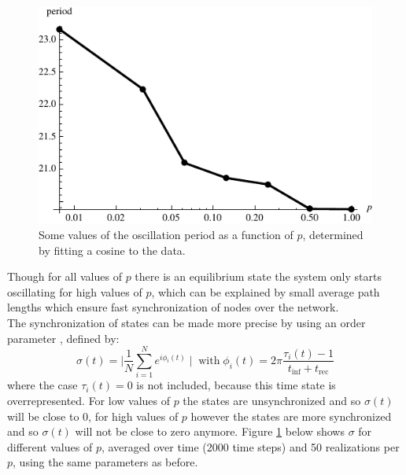 \documentclass[10pt,a4paper]{article}
\begin{document}
\begin{figure}[H]
  \centering
  \includegraphics[scale=1.1]{period.pdf}
  \caption{Some values of the oscillation period as a function of $p$, determined by fitting a cosine to the data.}
  \label{fig:sigma}
\end{figure}

\noindent Though for all values of $p$ there is an equilibrium state the system only starts oscillating for high values of $p$, which can be explained by small average path lengths which ensure fast synchronization of nodes over the network.\\
The synchronization of states can be made more precise by using an order parameter \cite{paper4}, defined by:
\begin{equation}
\sigma (t) = \mid \frac{1}{N} \sum_{i = 1}^{N} e^{i \phi_{i} (t)} \mid \; \text{with} \; \phi_{i} (t) = 2 \pi \frac{\tau_{i}(t) - 1}{t_{\text{inf}} + t_{\text{rec}}}
\end{equation}
where the case $\tau_{i}(t) = 0$ is not included, because this time state is overrepresented. For low values of $p$ the states are unsynchronized and so $\sigma(t)$ will be close to 0, for high values of $p$ however the states are more synchronized and so $\sigma(t)$ will not be close to zero anymore. Figure \ref{fig:sigma} below shows $\sigma$ for different values of $p$, averaged over time (2000 time steps) and 50 realizations per $p$, using the same parameters as before. 
\end{document}
